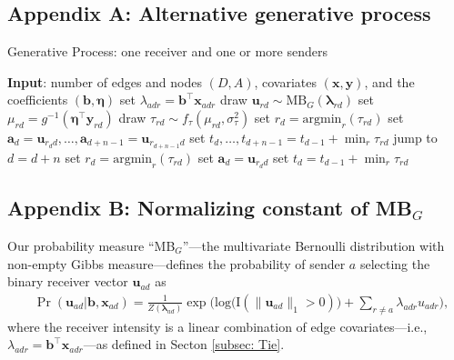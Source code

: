 \documentclass[ba]{imsart}
\numberwithin{equation}{section}
\theoremstyle{plain}
\begin{document}
	\subsection*{Appendix A: Alternative generative process} \label{appendix:alternativeGP}
	\begin{algorithm}[H]
		\SetAlgoLined
		\caption{Generative Process: one receiver and one or more senders}
		\begin{algorithmic}
			\STATE \textbf{Input}: number of edges and nodes $(D, A)$, covariates $(\boldsymbol{x}, \boldsymbol{y})$, and the coefficients $(\boldsymbol{b}, \boldsymbol{\eta})$
			\vskip 0.1in				
			\STATE	set $\lambda_{adr} = {\boldsymbol{b}}^{\top}\boldsymbol{x}_{adr}$
			\ENDFOR
			\STATE	draw $\boldsymbol{u}_{rd}  \sim
			\mbox{MB}_G(\boldsymbol{\lambda}_{rd})$
			\STATE		set $\mu_{rd} = g^{-1}(\boldsymbol{\eta}^\top \boldsymbol{y}_{rd})$
			\STATE		draw $\tau_{rd} \sim f_\tau(\mu_{rd}, \sigma_\tau^2)$
			\ENDFOR
			\STATE	set ${r}_d=\mbox{argmin}_{r}(\tau_{rd})$
			\STATE	set $\boldsymbol{a}_d=\boldsymbol{u}_{r_d d},\ldots,\boldsymbol{a}_{d+n-1}=\boldsymbol{u}_{r_{d+n-1} d}$
			\STATE	set $t_d, \ldots, t_{d+n-1}=t_{d-1} + \min_r\tau_{rd}$
			\STATE		jump to $d = d+n$
			\ELSE
			\STATE	set ${r}_d = \mbox{argmin}_{r}(\tau_{rd}) $
			\STATE	set $\boldsymbol{a}_d= \boldsymbol{u}_{r_d d}$
			\STATE	set $t_d =t_{d-1} + \min_r\tau_{rd}$
			\ENDIF
			\ENDFOR
		\end{algorithmic}
		\label{alg:generative2}
	\end{algorithm}
	\subsection*{Appendix B: Normalizing constant of MB$_{G}$}\label{appendix: non-empty Gibbs measure}
	Our probability measure ``MB$_{G}$''---the multivariate Bernoulli distribution with non-empty Gibbs measure---defines the probability of sender $a$ selecting the binary receiver vector $\boldsymbol{u}_{ad}$ as
	\begin{equation*} 
		\begin{aligned}
			& \Pr(\boldsymbol{u}_{ad}|\boldsymbol{b}, \boldsymbol{x}_{ad}) = \frac{1}{Z(\boldsymbol{\lambda}_{ad})}\exp\Big(\mbox{log}\big(\text{I}(\lVert \boldsymbol{u}_{ad} \rVert_1 > 0)\big) + \sum_{r \neq a} \lambda_{adr}u_{adr} \Big),
		\end{aligned}
	\end{equation*}
	where the receiver intensity is a linear combination of edge covariates---i.e., $\lambda_{adr} = {\boldsymbol{b}}^{\top}\boldsymbol{x}_{adr}$---as defined in Secton \ref{subsec: Tie}.
	
\end{document}
